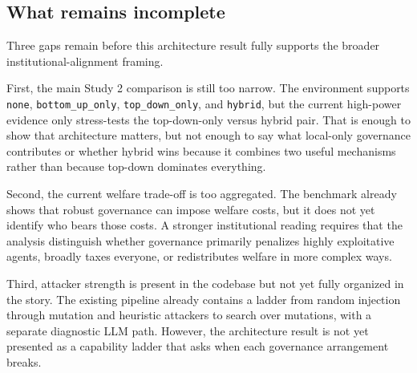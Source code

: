 \subsection{What remains incomplete}

Three gaps remain before this architecture result fully supports the broader institutional-alignment framing.

First, the main Study 2 comparison is still too narrow. The environment supports \texttt{none}, \texttt{bottom\_up\_only}, \texttt{top\_down\_only}, and \texttt{hybrid}, but the current high-power evidence only stress-tests the top-down-only versus hybrid pair. That is enough to show that architecture matters, but not enough to say what local-only governance contributes or whether hybrid wins because it combines two useful mechanisms rather than because top-down dominates everything.

Second, the current welfare trade-off is too aggregated. The benchmark already shows that robust governance can impose welfare costs, but it does not yet identify who bears those costs. A stronger institutional reading requires that the analysis distinguish whether governance primarily penalizes highly exploitative agents, broadly taxes everyone, or redistributes welfare in more complex ways.

Third, attacker strength is present in the codebase but not yet fully organized in the story. The existing pipeline already contains a ladder from random injection through mutation and heuristic attackers to search over mutations, with a separate diagnostic LLM path. However, the architecture result is not yet presented as a capability ladder that asks when each governance arrangement breaks.
